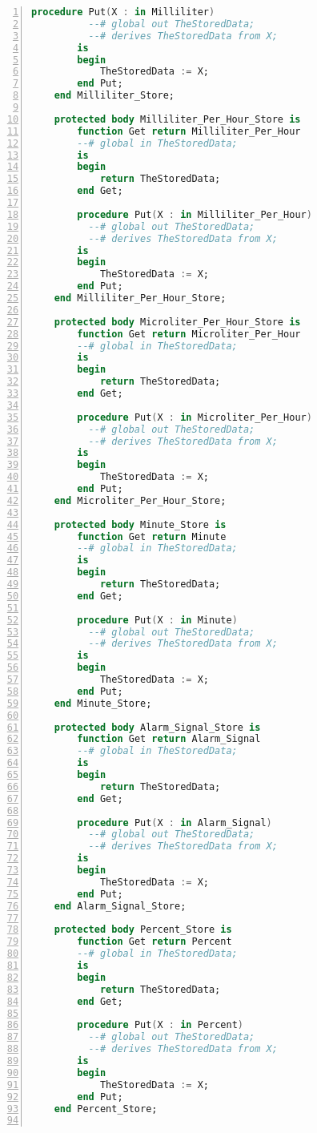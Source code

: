 \begin{lstlisting}[language=ada, gobble=0, numbers=left, caption={\lstinline{Ice_Types} package}]
        procedure Put(X : in Milliliter)
          --# global out TheStoredData;
          --# derives TheStoredData from X;
        is
        begin
            TheStoredData := X;
        end Put;
    end Milliliter_Store;

    protected body Milliliter_Per_Hour_Store is
        function Get return Milliliter_Per_Hour
        --# global in TheStoredData;
        is
        begin
            return TheStoredData;
        end Get;

        procedure Put(X : in Milliliter_Per_Hour)
          --# global out TheStoredData;
          --# derives TheStoredData from X;
        is
        begin
            TheStoredData := X;
        end Put;
    end Milliliter_Per_Hour_Store;

    protected body Microliter_Per_Hour_Store is
        function Get return Microliter_Per_Hour
        --# global in TheStoredData;
        is
        begin
            return TheStoredData;
        end Get;

        procedure Put(X : in Microliter_Per_Hour)
          --# global out TheStoredData;
          --# derives TheStoredData from X;
        is
        begin
            TheStoredData := X;
        end Put;
    end Microliter_Per_Hour_Store;

    protected body Minute_Store is
        function Get return Minute
        --# global in TheStoredData;
        is
        begin
            return TheStoredData;
        end Get;

        procedure Put(X : in Minute)
          --# global out TheStoredData;
          --# derives TheStoredData from X;
        is
        begin
            TheStoredData := X;
        end Put;
    end Minute_Store;

    protected body Alarm_Signal_Store is
        function Get return Alarm_Signal
        --# global in TheStoredData;
        is
        begin
            return TheStoredData;
        end Get;

        procedure Put(X : in Alarm_Signal)
          --# global out TheStoredData;
          --# derives TheStoredData from X;
        is
        begin
            TheStoredData := X;
        end Put;
    end Alarm_Signal_Store;

    protected body Percent_Store is
        function Get return Percent
        --# global in TheStoredData;
        is
        begin
            return TheStoredData;
        end Get;

        procedure Put(X : in Percent)
          --# global out TheStoredData;
          --# derives TheStoredData from X;
        is
        begin
            TheStoredData := X;
        end Put;
    end Percent_Store;


\end{lstlisting}
